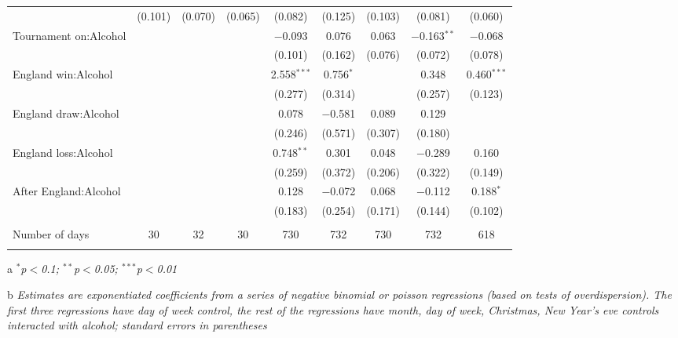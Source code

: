 \documentclass[12pt, a4paper]{article}
\begin{document}
\begin{table}
{\begin{threeparttable}
\begin{tabular}{@{\extracolsep{5pt}}lcccccccc}
  & (0.101) & (0.070) & (0.065) & (0.082) & (0.125) & (0.103) & (0.081) & (0.060) \\ 
  Tournament on:Alcohol &  &  &  & $-$0.093 & 0.076 & 0.063 & $-$0.163$^{**}$ & $-$0.068 \\ 
  &  &  &  & (0.101) & (0.162) & (0.076) & (0.072) & (0.078) \\ 
  England win:Alcohol &  &  &  & 2.558$^{***}$ & 0.756$^{*}$ &  & 0.348 & 0.460$^{***}$ \\ 
  &  &  &  & (0.277) & (0.314) &  & (0.257) & (0.123) \\ 
  England draw:Alcohol &  &  &  & 0.078 & $-$0.581 & 0.089 & 0.129 &  \\ 
  &  &  &  & (0.246) & (0.571) & (0.307) & (0.180) &  \\ 
  England loss:Alcohol &  &  &  & 0.748$^{**}$ & 0.301 & 0.048 & $-$0.289 & 0.160 \\ 
  &  &  &  & (0.259) & (0.372) & (0.206) & (0.322) & (0.149) \\ 
  After England:Alcohol &  &  &  & 0.128 & $-$0.072 & 0.068 & $-$0.112 & 0.188$^{*}$ \\ 
  &  &  &  & (0.183) & (0.254) & (0.171) & (0.144) & (0.102) \\ 
 \hline \\[-1.8ex] 
Number of days & 30 & 32 & 30 & 730 & 732 & 730 & 732 & 618 \\ 
\hline 
\hline \\[-1.8ex] 
\end{tabular} 
\begin{tablenotes}
      \item[a] \textit{$^{*}$p$<$0.1; $^{**}$p$<$0.05; $^{***}$p$<$0.01}
      \item[b] \textit{Estimates are exponentiated coefficients from a series of negative binomial or poisson regressions (based on tests of overdispersion). The first three regressions have day of week control, the rest of the regressions have month, day of week, Christmas, New Year's eve controls interacted with alcohol; standard errors in parentheses}
    \end{tablenotes}
\end{threeparttable} }
\end{table}
\end{document}
